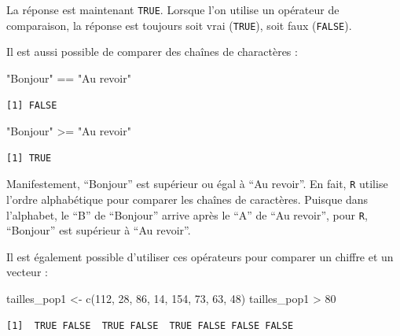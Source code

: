 \documentclass[
  a4paper,
  DIV=11,
  numbers=noendperiod,
  oneside]{scrreprt}
\newenvironment{Shaded}{}{}
\newcommand{\DecValTok}[1]{\textcolor[rgb]{0.00,0.36,0.77}{#1}}
\newcommand{\FunctionTok}[1]{\textcolor[rgb]{0.44,0.26,0.76}{#1}}
\newcommand{\NormalTok}[1]{\textcolor[rgb]{0.14,0.16,0.18}{#1}}
\newcommand{\OtherTok}[1]{\textcolor[rgb]{0.44,0.26,0.76}{#1}}
\newcommand{\SpecialCharTok}[1]{\textcolor[rgb]{0.00,0.36,0.77}{#1}}
\newcommand{\StringTok}[1]{\textcolor[rgb]{0.01,0.18,0.38}{#1}}
\begin{document}
La réponse est maintenant \texttt{TRUE}. Lorsque l'on utilise un
opérateur de comparaison, la réponse est toujours soit vrai
(\texttt{TRUE}), soit faux (\texttt{FALSE}).

Il est aussi possible de comparer des chaînes de charactères :

\begin{Shaded}
\begin{Highlighting}[]
\StringTok{"Bonjour"} \SpecialCharTok{==} \StringTok{"Au revoir"}
\end{Highlighting}
\end{Shaded}

\begin{verbatim}
[1] FALSE
\end{verbatim}

\begin{Shaded}
\begin{Highlighting}[]
\StringTok{"Bonjour"} \SpecialCharTok{\textgreater{}=} \StringTok{"Au revoir"}
\end{Highlighting}
\end{Shaded}

\begin{verbatim}
[1] TRUE
\end{verbatim}

Manifestement, ``Bonjour'' est supérieur ou égal à ``Au revoir''. En
fait, \texttt{R} utilise l'ordre alphabétique pour comparer les chaînes
de caractères. Puisque dans l'alphabet, le ``B'' de ``Bonjour'' arrive
après le ``A'' de ``Au revoir'', pour \texttt{R}, ``Bonjour'' est
supérieur à ``Au revoir''.

Il est également possible d'utiliser ces opérateurs pour comparer un
chiffre et un vecteur :

\begin{Shaded}
\begin{Highlighting}[]
\NormalTok{tailles\_pop1 }\OtherTok{\textless{}{-}} \FunctionTok{c}\NormalTok{(}\DecValTok{112}\NormalTok{, }\DecValTok{28}\NormalTok{, }\DecValTok{86}\NormalTok{, }\DecValTok{14}\NormalTok{, }\DecValTok{154}\NormalTok{, }\DecValTok{73}\NormalTok{, }\DecValTok{63}\NormalTok{, }\DecValTok{48}\NormalTok{)}
\NormalTok{tailles\_pop1 }\SpecialCharTok{\textgreater{}} \DecValTok{80}
\end{Highlighting}
\end{Shaded}

\begin{verbatim}
[1]  TRUE FALSE  TRUE FALSE  TRUE FALSE FALSE FALSE
\end{verbatim}
\end{document}
